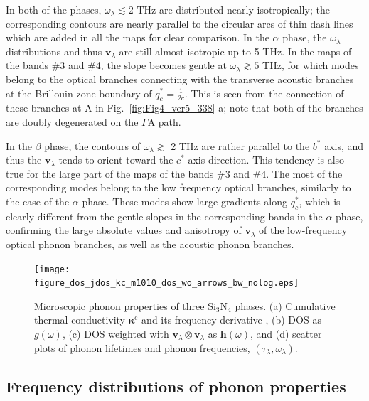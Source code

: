 \documentclass[twocolumn,amsmath,amssymb,a4paper,prb,superscriptaddress,floatfix]{revtex4-1}
\begin{document}
In both of the phases, $\omega_{\lambda} \lesssim 2$ THz are distributed nearly
isotropically; the corresponding contours are nearly parallel to the circular
arcs of thin dash lines which are added in all the maps for clear comparison.
In the $\alpha$ phase, the $\omega_{\lambda}$ distributions and thus
$\mathbf{v}_{\lambda}$ are still almost isotropic up to 5 THz. In the maps of
the bands \#3 and \#4, the slope becomes gentle at $\omega_\lambda \gtrsim 5$
THz, for which modes belong to the optical branches connecting with the
transverse acoustic branches at the Brillouin zone boundary of $q_c^* =
\frac{1}{2c}$. This is seen from the connection of these branches at A in
Fig.~\ref{fig:Fig4_ver5_338}-a; note that both of the branches are doubly
degenerated on the $\Gamma$A path.

In the $\beta$ phase, the contours of $\omega_{\lambda} \gtrsim$ 2 THz are
rather parallel to the $b^*$ axis, and thus the $\mathbf{v}_{\lambda}$ tends to
orient toward the $c^*$ axis direction. This tendency is also true for the
large part of the maps of the bands \#3 and \#4. The most of the corresponding modes belong
to the low frequency optical branches, similarly to the case of the $\alpha$ phase.
These modes show large gradients along $q_c^*$, which is clearly different from
the gentle slopes in the corresponding bands in the $\alpha$ phase, confirming
the large absolute values and anisotropy of $\mathbf{v}_{\lambda}$ of the
low-frequency optical phonon branches, as well as the acoustic phonon branches.

\begin{figure}[ht]
 \begin{center}
	 \texttt{[image: figure\_dos\_jdos\_kc\_m1010\_dos\_wo\_arrows\_bw\_nolog.eps]}
  \caption{Microscopic phonon properties of three Si$_3$N$_4$
	  phases. (a) Cumulative thermal conductivity $\boldsymbol{\kappa}^\text{c}$ and
	  its frequency derivative
	  , (b) DOS as $g(\omega)$, (c) DOS weighted with $\mathbf{v}_\lambda \otimes
	  \mathbf{v}_\lambda$ as $\boldsymbol{h}(\omega)$, and (d) scatter plots of phonon
	  lifetimes and phonon frequencies, $(\tau_\lambda,\omega_\lambda)$.
  \label{fig:Fig5_338_rev} }
 \end{center}
\end{figure}

\subsection{Frequency distributions of phonon properties}
\end{document}
